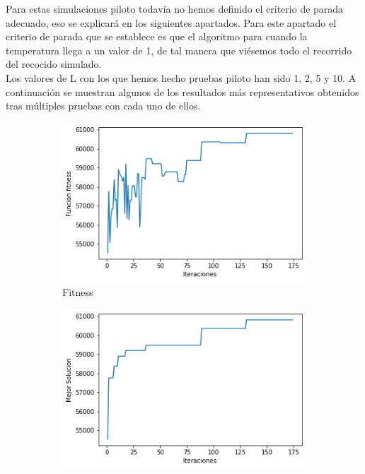 \documentclass[a4paper,12pt]{article}
\begin{document}
	Para estas simulaciones piloto todavía no hemos definido el criterio de parada adecuado, eso se explicará en los siguientes apartados. Para este apartado el criterio de parada que se establece es que el algoritmo para cuando la temperatura llega a un valor de 1, de tal manera que viésemos todo el recorrido del recocido simulado.\\

	Los valores de L con los que hemos hecho pruebas piloto han sido 1, 2, 5 y 10. A continuación se muestran algunos de los resultados más representativos obtenidos tras múltiples pruebas con cada uno de ellos.\\

	
	
	\begin{figure}[H]
		\centering
		\begin{subfigure}{0.24\textwidth}
			\centering
			\includegraphics[width=\textwidth]{include/L1/fitness.png}
			\caption{Fitness}
		\end{subfigure}
		\hfill
		\begin{subfigure}{0.24\textwidth}
			\centering
			\includegraphics[width=\textwidth]{include/L1/mejor_solucion.png}

\end{subfigure}
\end{figure}
\end{document}
